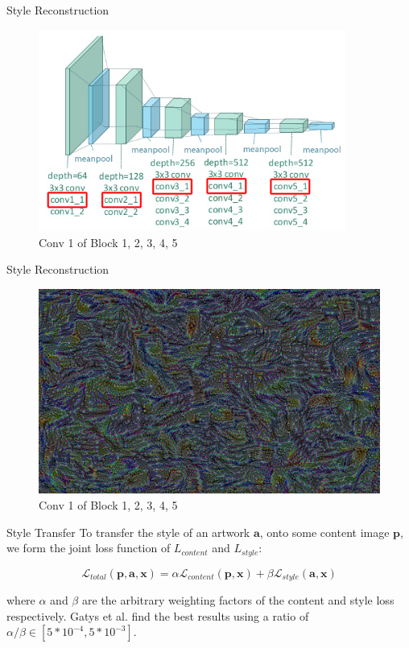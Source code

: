 \documentclass{beamer}
\begin{document}
\begin{frame}{Style Reconstruction}
\begin{figure}[ht]
\centering
\caption{Conv 1 of Block 1, 2, 3, 4, 5}
\includegraphics[width=0.9\textwidth]{img/vgg19/style/block5_conv1}
\end{figure}
\end{frame}
\begin{frame}{Style Reconstruction}
\begin{figure}[ht]
\centering
\caption{Conv 1 of Block 1, 2, 3, 4, 5}
\includegraphics[width=\textwidth]{img/style/block5_conv1.png}
\end{figure}
\end{frame}

\begin{frame}{Style Transfer}
To transfer the style of an artwork $\textbf{a}$, onto some content image
$\textbf{p}$, we form the joint loss function of $L_{content}$ and
$L_{style}$:

\begin{equation}
    \mathcal{L}_{total}(\mathbf{p}, \mathbf{a}, \mathbf{x}) =
    \alpha \mathcal{L}_{content}(\mathbf{p}, \mathbf{x}) +
    \beta \mathcal{L}_{style}(\mathbf{a}, \mathbf{x})
\end{equation}

where $\alpha$ and $\beta$ are the arbitrary weighting factors of the content
and style loss respectively. Gatys et al. find the best results using a ratio
of $\alpha / \beta \in [5*10^{-4}, 5*10^{-3}]$.

\end{frame}
\end{document}
